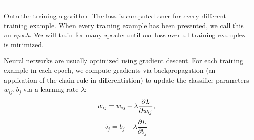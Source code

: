 \documentclass{csci1430}
\begin{document}
%
%
%
%
%
%

\hspace{\fill}\rule{0.5\linewidth}{.5pt}\hspace{\fill}

Onto the training algorithm. The loss is computed once for every different training example. When every training example has been presented, we call this an \emph{epoch}. We will train for many epochs until our loss over all training examples is minimized.

Neural networks are usually optimized using gradient descent. For each training example in each epoch, we compute gradients via backpropagation (an application of the chain rule in differentiation) to update the classifier parameters $w_{ij}, b_j$ via a learning rate $\lambda$:
\begin{equation}
w_{ij} = w_{ij} - \lambda\frac{\partial L}{\partial w_{ij}}, \\
\label{eq:graddesc_updateweights}
\end{equation}
\begin{equation}
b_j = b_j - \lambda\frac{\partial L}{\partial b_j}.
\label{eq:graddesc_updatebias}
\end{equation}
\end{document}
